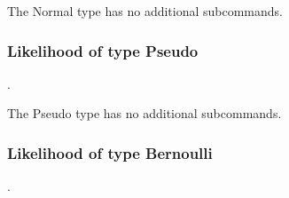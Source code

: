 The Normal type has no additional subcommands.
\subsubsection{Likelihood of type Pseudo}
.
\label{syntax:Likelihood-Pseudo}

The Pseudo type has no additional subcommands.

\subsubsection{Likelihood of type Bernoulli}
.
\label{syntax:Likelihood-Bernoulli}